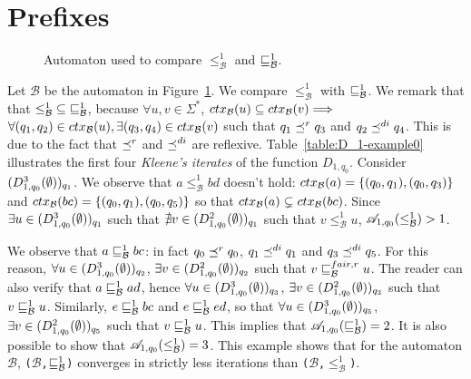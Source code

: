 \section{Prefixes}

\begin{figure}[h]
\centering
{}
\caption{Automaton used to compare $\leq^1_{\mathcal{B}}$ and $\sqsubseteq^1_{\mathcal{B}}$.}
\label{fig:example-prefix-ctx-vs-wsdir}
\end{figure}

\begin{example}
Let $\mathcal{B}$ be the automaton in
Figure~\ref{fig:example-prefix-ctx-vs-wsdir}.
We compare $\leq^1_{\mathcal{B}}$ with $\sqsubseteq^1_{\mathcal{B}}$.
We remark that that $\mathord{\leq^1_{\mathcal{B}}} \subseteq \mathord{\sqsubseteq^1_{\mathcal{B}}}$,
because $\forall u,v \in \Sigma^*$,
$ctx_{\mathcal{B}}(u) \subseteq ctx_{\mathcal{B}}(v) \Longrightarrow$ $\forall (q_1,q_2) \in ctx_{\mathcal{B}}(u),
\exists (q_3,q_4) \in ctx_{\mathcal{B}}(v)$ such that $q_1 \preceq^r q_3$ and $q_2 \preceq^{di} q_4$.
This is due to the fact that $\preceq^r$ and $\preceq^{di}$ are reflexive.
Table~\ref{table:D_1-example0} illustrates the first four \emph{Kleene's iterates}
of the function $D_{1,q_0}$.
Consider $(D_{1,q_0}^{3}(\emptyset))_{q_1}$.
We observe that $a \leq^1_{\mathcal{B}} bd$ doesn't hold:
$ctx_{\mathcal{B}}(a) = \{(q_0,q_1), (q_0,q_3)\}$ and $ctx_{\mathcal{B}}(bc) = \{(q_0,q_1), (q_0,q_5)\}$
so that $ctx_{\mathcal{B}}(a) \subsetneq ctx_{\mathcal{B}}(bc)$.
Since $\exists u \in (D_{1,q_0}^{3}(\emptyset))_{q_1}$ such that $\nexists v  \in (D_{1,q_0}^{2}(\emptyset))_{q_1}$
such that $v \leq^1_{\mathcal{B}} u$, $\mathscr{A}_{1, q_0}(\leq^1_{\mathcal{B}}) > 1$.

We observe that $a \sqsubseteq^1_{\mathcal{B}} bc$: in fact $q_0 \preceq^r q_0$, $q_1 \preceq^{di} q_1$
and $q_3 \preceq^{di} q_5$.
For this reason, $\forall u \in (D_{1,q_0}^{3}(\emptyset))_{q_2}$, $\exists v \in (D_{1,q_0}^{2}(\emptyset))_{q_2}$
such that $v \sqsubseteq_{\mathcal{B}}^{fair,r} u$.
The reader can also verify that $a \sqsubseteq^1_{\mathcal{B}} ad$, hence
$\forall u \in (D_{1,q_0}^{3}(\emptyset))_{q_3}$, $\exists v \in (D_{1,q_0}^{2}(\emptyset))_{q_3}$
such that $v \sqsubseteq^1_{\mathcal{B}} u$.
Similarly, $e \sqsubseteq^1_{\mathcal{B}} bc$ and $e \sqsubseteq^1_{\mathcal{B}} ed$, so that
$\forall u \in (D_{1,q_0}^{3}(\emptyset))_{q_5}$, $\exists v \in (D_{1,q_0}^{2}(\emptyset))_{q_5}$
such that $v \sqsubseteq^1_{\mathcal{B}} u$.
This implies that $\mathscr{A}_{1, q_0}(\sqsubseteq^1_{\mathcal{B}}) = 2$.
It is also possible to show that $\mathscr{A}_{1, q_0}(\leq^1_{\mathcal{B}}) = 3$.
This example shows that for the automaton $\mathcal{B}$,
\texttt{($\mathcal{B}$,$\sqsubseteq^1_{\mathcal{B}}$)} converges in strictly less iterations
than \texttt{($\mathcal{B}$,$\leq^1_{\mathcal{B}}$)}.
\end{example}

